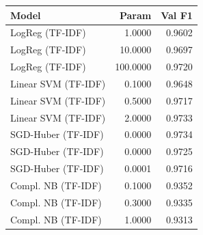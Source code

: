 \begin{tabular}{lrr}
\toprule
Model & Param & Val F1 \\
\midrule
LogReg (TF-IDF) & 1.0000 & 0.9602 \\
LogReg (TF-IDF) & 10.0000 & 0.9697 \\
LogReg (TF-IDF) & 100.0000 & 0.9720 \\
Linear SVM (TF-IDF) & 0.1000 & 0.9648 \\
Linear SVM (TF-IDF) & 0.5000 & 0.9717 \\
Linear SVM (TF-IDF) & 2.0000 & 0.9733 \\
SGD-Huber (TF-IDF) & 0.0000 & 0.9734 \\
SGD-Huber (TF-IDF) & 0.0000 & 0.9725 \\
SGD-Huber (TF-IDF) & 0.0001 & 0.9716 \\
Compl. NB (TF-IDF) & 0.1000 & 0.9352 \\
Compl. NB (TF-IDF) & 0.3000 & 0.9335 \\
Compl. NB (TF-IDF) & 1.0000 & 0.9313 \\
\bottomrule
\end{tabular}
